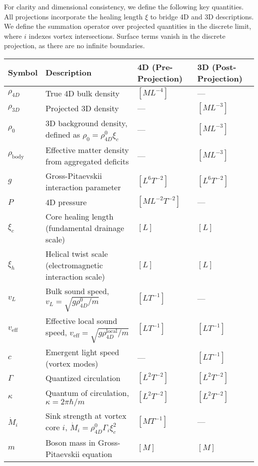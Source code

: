For clarity and dimensional consistency, we define the following key quantities. All projections incorporate the healing length $\xi$ to bridge 4D and 3D descriptions. We define the summation operator over projected quantities in the discrete limit, where $i$ indexes vortex intersections. Surface terms vanish in the discrete projection, as there are no infinite boundaries.

\begin{table}[H]
\centering
\begin{tabularx}{\textwidth}{|l|Y|l|l|}
\hline
Symbol & Description & 4D (Pre-Projection) & 3D (Post-Projection) \\
\hline
$\rho_{4D}$ & True 4D bulk density & $[M L^{-4}]$ & --- \\
\hline
$\rho_{3D}$ & Projected 3D density & --- & $[M L^{-3}]$ \\
\hline
$\rho_0$ & 3D background density, defined as $\rho_0 = \rho_{4D}^0 \xi_c$ & --- & $[M L^{-3}]$ \\
\hline
$\rho_{\text{body}}$ & Effective matter density from aggregated deficits & --- & $[M L^{-3}]$ \\
\hline
$g$ & Gross-Pitaevskii interaction parameter & $[L^6 T^{-2}]$ & $[L^6 T^{-2}]$ \\
\hline
$P$ & 4D pressure & $[M L^{-2} T^{-2}]$ & --- \\
\hline
$\xi_c$ & Core healing length (fundamental drainage scale) & $[L]$ & $[L]$ \\
\hline
$\xi_h$ & Helical twist scale (electromagnetic interaction scale) & $[L]$ & $[L]$ \\
\hline
$v_L$ & Bulk sound speed, $v_L = \sqrt{g \rho_{4D}^0 / m}$ & $[L T^{-1}]$ & --- \\
\hline
$v_{\text{eff}}$ & Effective local sound speed, $v_{\text{eff}} = \sqrt{g \rho_{4D}^{\text{local}} / m}$ & $[L T^{-1}]$ & $[L T^{-1}]$ \\
\hline
$c$ & Emergent light speed (vortex modes) & --- & $[L T^{-1}]$ \\
\hline
$\Gamma$ & Quantized circulation & $[L^2 T^{-2}]$ & $[L^2 T^{-2}]$ \\
\hline
$\kappa$ & Quantum of circulation, $\kappa = 2 \pi \hbar / m$ & $[L^2 T^{-2}]$ & $[L^2 T^{-2}]$ \\
\hline
$\dot{M}_i$ & Sink strength at vortex core $i$, $\dot{M}_i = \rho_{4D}^0 \Gamma_i \xi_c^2$ & $[M T^{-1}]$ & --- \\
\hline
$m$ & Boson mass in Gross-Pitaevskii equation & $[M]$ & $[M]$ \\

\end{tabularx}
\end{table}
